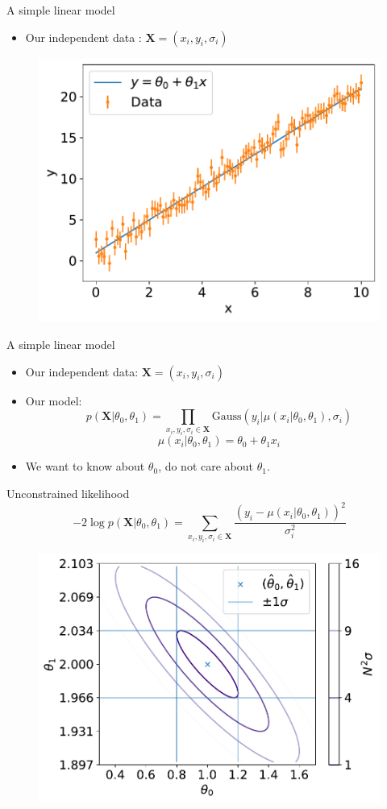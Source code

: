 \documentclass[
aspectratio=169,
14pt,
professionalfonts
]{beamer}
\newcommand{\arrow}{~\ding{220}~}
\begin{document}
\begin{frame}{A simple linear model}

    \begin{itemize}
        \item Our independent data : $\boldsymbol{X} = (x_i, y_i, \sigma_i)$
    \end{itemize}

    \begin{figure}
        \centering
        \includegraphics[width=0.5\linewidth]{../plots/linear_data.pdf}
    \end{figure}

\end{frame}

\begin{frame}{A simple linear model}
    \begin{itemize}
        \item Our independent data: $\boldsymbol{X} = (x_i, y_i, \sigma_i)$
        \item Our model:
        $$ p(\boldsymbol{X}|\theta_0, \theta_1) = \prod_{x_i, y_i,\sigma_i \in \boldsymbol{X}}\text{Gauss}(y_i | \mu(x_i|\theta_0, \theta_1), \sigma_i)$$
        $$\mu(x_i|\theta_0, \theta_1) = \theta_0 + \theta_1 x_i$$
         \item[\arrow] We want to know about $\theta_0$, do not care about $\theta_1$.
    \end{itemize}
\end{frame}

\begin{frame}{Unconstrained likelihood}
\vspace{-1cm}
    $$ -2\log p(\boldsymbol{X}|\theta_0, \theta_1) = \sum_{x_i, y_i,\sigma_i \in \boldsymbol{X}}\frac{\left(y_i -\mu(x_i|\theta_0, \theta_1)\right)^2}{\sigma_i^2}$$
    \begin{figure}
        \centering
        \includegraphics[width=0.5\linewidth]{../plots/nll_unconstr.pdf}
    \end{figure}
\end{frame}
\end{document}
